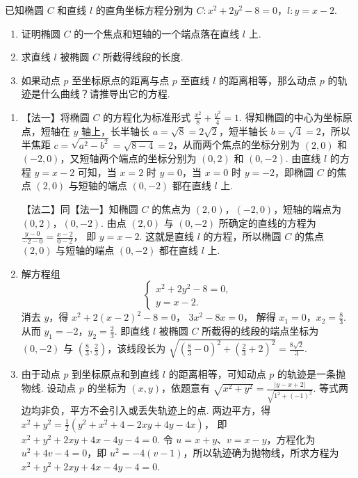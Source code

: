 \documentclass[UTF8,a4paper,oneside,11pt]{ctexbook}
\begin{document}
\begin{problem}

已知椭圆 \(C\) 和直线 \(l\) 的直角坐标方程分别为 \(C:x^{2}+2y^{2}-8=0\)，\(l:y=x-2\).

\begin{enumerate}
\item 证明椭圆 \(C\) 的一个焦点和短轴的一个端点落在直线 \(l\) 上.
\item 求直线 \(l\) 被椭圆 \(C\) 所截得线段的长度.
\item 如果动点 \(p\) 至坐标原点的距离与点 \(p\) 至直线 \(l\) 的距离相等，那么动点 \(p\) 的轨迹是什么曲线？请推导出它的方程.
\end{enumerate}

\begin{solution}
\begin{enumerate}
\item 【法一】将椭圆 \(C\) 的方程化为标准形式
\(\frac{x^{2}}{8}+\frac{y^{2}}{4}=1\).
得知椭圆的中心为坐标原点，短轴在 \(y\) 轴上，长半轴长 \(a=\sqrt{8}=2\sqrt{2}\)，短半轴长 \(b=\sqrt{4}=2\)，所以半焦距 \(c=\sqrt{a^{2}-b^{2}}=\sqrt{8-4}=2\)，从而两个焦点的坐标分别为 \((2,0)\) 和 \((-2,0)\)，又短轴两个端点的坐标分别为 \((0,2)\) 和 \((0,-2)\). 由直线 \(l\) 的方程 \(y=x-2\) 可知，当 \(x=2\) 时 \(y=0\)，当 \(x=0\) 时 \(y=-2\)，即椭圆 \(C\) 的焦点 \((2,0)\) 与短轴的端点 \((0,-2)\) 都在直线 \(l\) 上.

【法二】同【法一】知椭圆 \(C\) 的焦点为 \((2,0)\)，\((-2,0)\)，短轴的端点为 \((0,2)\)，\((0,-2)\). 由点 \((2,0)\) 与 \((0,-2)\) 所确定的直线的方程为
\(\frac{y-0}{-2-0}=\frac{x-2}{0-2}\)，
即
\(y=x-2\).
这就是直线 \(l\) 的方程，所以椭圆 \(C\) 的焦点 \((2,0)\) 与短轴的端点 \((0,-2)\) 都在直线 \(l\) 上.

\item 解方程组
\[
\begin{cases}
x^{2}+2y^{2}-8=0,\\
y=x-2.
\end{cases}
\]
消去 \(y\)，得
\(x^{2}+2(x-2)^{2}-8=0\)，
\(3x^{2}-8x=0\)，
解得
\(x_{1}=0\)，\(x_{2}=\frac{8}{3}\).
从而
\(y_{1}=-2\)，\(y_{2}=\frac{2}{3}\).
即直线 \(l\) 被椭圆 \(C\) 所截得的线段的端点坐标为 \((0,-2)\) 与 \(\left(\frac{8}{3},\frac{2}{3}\right)\)，该线段长为
\(\sqrt{\left(\frac{8}{3}-0\right)^{2}+\left(\frac{2}{3}+2\right)^{2}}=\frac{8\sqrt{2}}{3}\).

\item 由于动点 \(p\) 到坐标原点和到直线 \(l\) 的距离相等，可知动点 \(p\) 的轨迹是一条抛物线. 设动点 \(p\) 的坐标为 \((x,y)\)，依题意有
\(\sqrt{x^{2}+y^{2}}=\frac{|y-x+2|}{\sqrt{1^{2}+(-1)^{2}}}\).
等式两边均非负，平方不会引入或丢失轨迹上的点. 两边平方，得
\(x^{2}+y^{2}=\frac{1}{2}(y^{2}+x^{2}+4-2xy+4y-4x)\)，
即 \(x^{2}+y^{2}+2xy+4x-4y-4=0\). 令 \(u=x+y\)、\(v=x-y\)，方程化为 \(u^{2}+4v-4=0\)，即 \(u^{2}=-4(v-1)\)，所以轨迹确为抛物线，所求方程为 \(x^{2}+y^{2}+2xy+4x-4y-4=0\).
\end{enumerate}
\end{solution}
\end{problem}
\end{document}
